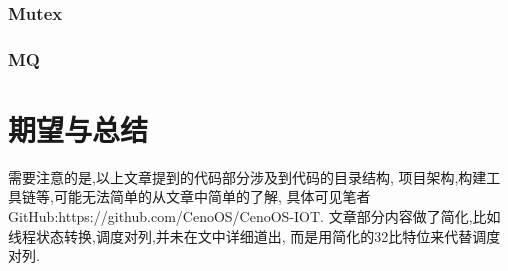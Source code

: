 \subsection{Mutex}
\subsection{MQ}




\chapter{期望与总结}
需要注意的是,以上文章提到的代码部分涉及到代码的目录结构,
项目架构,构建工具链等,可能无法简单的从文章中简单的了解,
具体可见笔者GitHub:https://github.com/CenoOS/CenoOS-IOT.
文章部分内容做了简化,比如线程状态转换,调度对列,并未在文中详细道出,
而是用简化的32比特位来代替调度对列.



